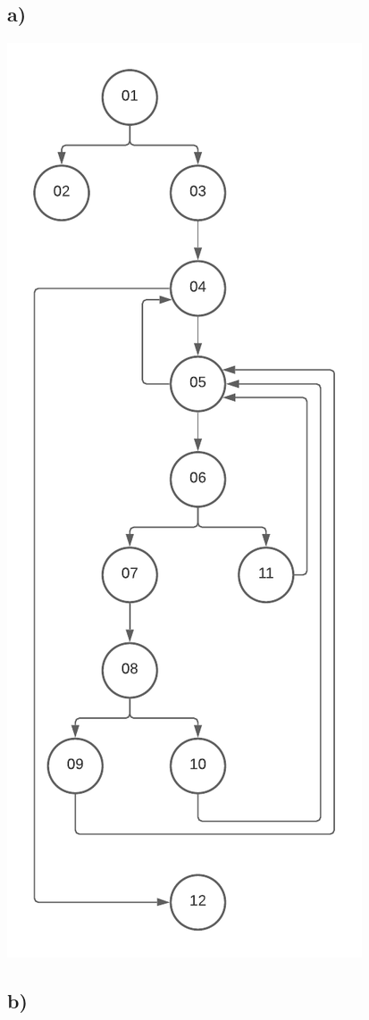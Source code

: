 \documentclass[a4paper,11pt]{scrartcl}
\begin{document}
	\subsection*{a)}
	    \includegraphics[scale=1]{src/08_2a_Controlflow.pdf}
	\subsection*{b)}	
\end{document}
